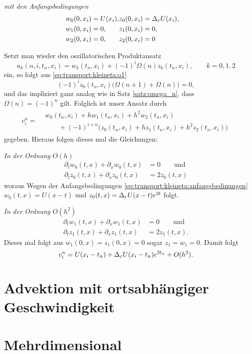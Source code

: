 \emph{mit den Anfangsbedingungen}
\begin{align}\label{eq:transport:kleineta:anfangsbedinungen}
\begin{split}
w_0(0, x_i) &= U(x_i),\\
w_1(0, x_i) &= 0,\\
w_2(0, x_i) &= 0,
\end{split}&
\begin{split}
z_0(0, x_i) &= \Delta_\varepsilon U(x_i),\\
z_1(0, x_i) &= 0,\\
z_2(0, x_i) &= 0
\end{split}
\end{align}

Setzt man wieder den oszillatorischen Produktansatz
\[ u_k(n, i, t_n, x_i) = w_k(t_n, x_i) + (-1)^i \Omega(n) z_k(t_n, x_i), \qquad k = 0,1,2 \]
ein, so folgt aus \eqref{eq:transport:kleineta:o1}
\[ (-1)^i z_0(t_n, x_i) \bigl( \Omega(n+1) + \Omega(n) \bigr) = 0, \]
und das impliziert ganz analog wie in Satz \ref{satz:omega_n}, dass $\Omega(n) = (-1)^n$ gilt.
Folglich ist unser Ansatz durch
\begin{align}
v^n_i = \begin{split}
&w_0(t_n, x_i) + h w_1(t_n, x_i) + h^2 w_2(t_n, x_i)\\
&\qquad + (-1)^{i+n} \bigl( z_0(t_n, x_i) + h z_1(t_n, x_i) + h^2 z_2(t_n, x_i) \bigr)
\end{split}
\end{align}
gegeben. Hieraus folgen dieses mal die Gleichungen:

\vspace{0.4cm}
\noindent \emph{In der Ordnung $O(h)$}
\begin{align*}
\partial_t w_0(t, x) + \partial_x w_0(t, x) &= 0 \qquad \text{und}\\
\partial_t z_0(t, x) + \partial_x z_0(t, x) &= 2 z_0(t, x)
\end{align*}
woraus Wegen der Anfangsbedingungen \eqref{eq:transport:kleineta:anfangsbedinungen} $w_0(t,x) = U(x -t)$ und $z_0(t,x) = \Delta_\varepsilon U(x - t) e^{2 t}$ folgt.

\vspace{0.4cm}
\noindent \emph{In der Ordnung $O(h^2)$}
\begin{align*}
\partial_t w_1(t, x) + \partial_x w_1(t, x) &= 0 \qquad \text{und}\\
\partial_t z_1(t, x) + \partial_x z_1(t, x) &= 2 z_1(t, x).
\end{align*}
Dieses mal folgt aus $w_1(0,x) = z_1(0,x) = 0$ sogar $z_1 = w_1 = 0$.
Damit folgt
\[ v^n_i = U(x_i - t_n) + \Delta_\varepsilon U(x_i - t_n) e^{2t_n} + O(h^2). \]
\section{Advektion mit ortsabhängiger Geschwindigkeit}

\section{Mehrdimensional}